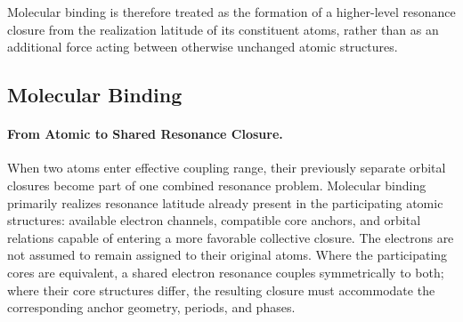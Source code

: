 \documentclass[11pt,a4paper]{article}
\begin{document}
Molecular binding is therefore treated as the formation of a higher-level resonance closure from the realization latitude of its constituent atoms, rather than as an additional force acting between otherwise unchanged atomic structures.





\subsection{Molecular Binding}

\paragraph{From Atomic to Shared Resonance Closure.}

When two atoms enter effective coupling range, their previously separate orbital closures become part of one combined resonance problem. Molecular binding primarily realizes resonance latitude already present in the participating atomic structures: available electron channels, compatible core anchors, and orbital relations capable of entering a more favorable collective closure. The electrons are not assumed to remain assigned to their original atoms. Where the participating cores are equivalent, a shared electron resonance couples symmetrically to both; where their core structures differ, the resulting closure must accommodate the corresponding anchor geometry, periods, and phases.
\end{document}
